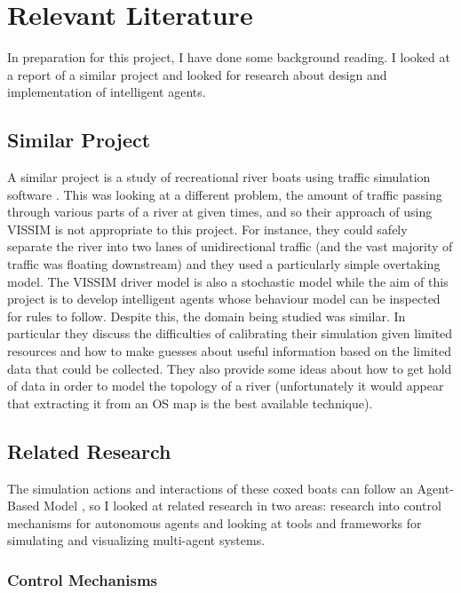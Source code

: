 \chapter{Relevant Literature}

In preparation for this project, I have done some background
reading. I looked at a report of a similar project and looked for research about design and implementation of intelligent agents. 

\section{Similar Project}

A similar project is a study of recreational river boats using
traffic simulation software \cite{Lowry2011}. This was looking at a
different problem, the amount of traffic passing through various parts
of a river at given times, and so their approach of using VISSIM is
not appropriate to this project. For instance, they could safely
separate the river into two lanes of unidirectional traffic (and the
vast majority of traffic was floating downstream) and they used a
particularly simple overtaking model. The VISSIM driver model is also
a stochastic model while the aim of this project is to develop
intelligent agents whose behaviour model can be inspected for rules to
follow. Despite this, the domain being studied was
similar. In particular they discuss the difficulties of calibrating
their simulation given limited resources and how to make guesses
about useful information based on the limited data that could be
collected. They also provide some ideas about how to get hold of data
in order to model the topology of a river (unfortunately it would
appear that extracting it from an OS map is the best available
technique).

\section{Related Research}

The simulation actions and interactions of these coxed boats can
follow an Agent-Based Model \cite{Wikipedia}, so I looked at related research in two areas: research into control mechanisms for
autonomous agents and looking at tools and frameworks for simulating
and visualizing multi-agent systems.

\subsection{Control Mechanisms}

